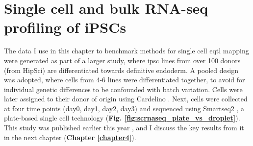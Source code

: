 \newpage

\section{Single cell and bulk RNA-seq profiling of iPSCs}

The data I use in this chapter to benchmark methods for single cell \gls{eqtl} mapping 
were generated as part of a larger study, where \gls{ipsc} lines from over 100 donors (from HipSci) are differentiated towards definitive endoderm.
A pooled design was adopted, where cells from 4-6 lines were differentiated together, to avoid for individual genetic differences to be confounded with batch variation. 
Cells were later assigned to their donor of origin using Cardelino \cite{mccarthy2020cardelino}. 
Next, cells were collected at four time points (day0, day1, day2, day3) and sequenced using Smartseq2 \cite{picelli2013smart}, a plate-based single cell technology (\textbf{Fig. \ref{fig:scrnaseq_plate_vs_droplet}}).
This study was published earlier this year \cite{cuomo2020single}, and I discuss the key results from it in the next chapter (\textbf{Chapter 
\ref{chapter4}}).
\\

